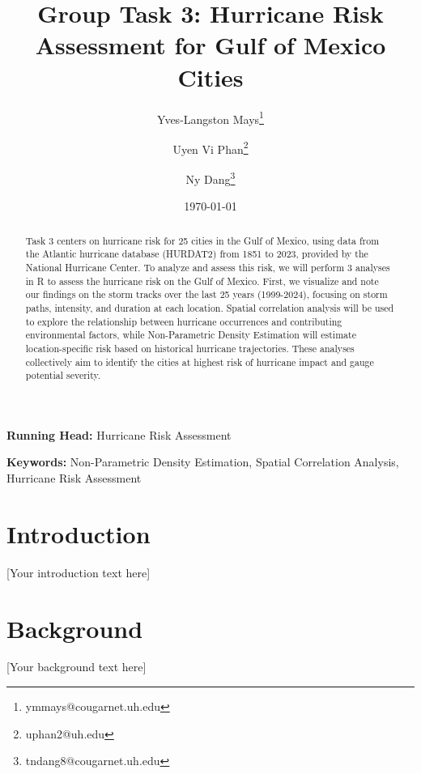 \documentclass[12pt,letterpaper]{article}
\begin{document}
\begin{titlepage}
\vspace*{2cm}

\title{Group Task 3: Hurricane Risk Assessment for Gulf of Mexico Cities}
\author[1]{Yves-Langston Mays\thanks{ymmays@cougarnet.uh.edu}}
\author[1]{Uyen Vi Phan\thanks{uphan2@uh.edu}}
\author[1]{Ny Dang\thanks{tndang8@cougarnet.uh.edu}}
\date{\today}

\maketitle

\vspace{2cm}
{\small\textbf{Running Head:} Hurricane Risk Assessment}

\vspace{1cm}
{\small\textbf{Keywords:} Non-Parametric Density Estimation, Spatial Correlation Analysis, Hurricane Risk Assessment}

\end{titlepage}

\begin{abstract}
Task 3 centers on hurricane risk for 25 cities in the Gulf of Mexico, using data from the Atlantic hurricane database (HURDAT2) from 1851 to 2023, provided by the National Hurricane Center. To analyze and assess this risk, we will perform 3 analyses in R to assess the hurricane risk on the Gulf of Mexico. First, we visualize and note our findings on the storm tracks over the last 25 years (1999-2024), focusing on storm paths, intensity, and duration at each location. Spatial correlation analysis will be used to explore the relationship between hurricane occurrences and contributing environmental factors, while Non-Parametric Density Estimation will estimate location-specific risk based on historical hurricane trajectories. These analyses collectively aim to identify the cities at highest risk of hurricane impact and gauge potential severity.
\end{abstract}

\newpage

\section{Introduction}
[Your introduction text here]

\section{Background}
[Your background text here]
\end{document}
